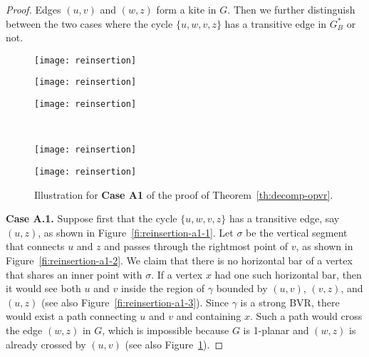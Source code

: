 \documentclass{article}
\begin{document}
\begin{proof}
\smallskip{}  Edges $(u,v)$ and $(w,z)$ form a kite in $G$. Then we further distinguish between the two cases where the cycle $\{u,w,v,z\}$ has a transitive edge in $G^*_B$ or not.


\begin{figure}[t]
    \centering
    \begin{minipage}[b]{.31\textwidth}
    	\centering
    	\texttt{[image: reinsertion]}
    	\subcaption{}\label{fi:reinsertion-a1-1}
    \end{minipage}
     \begin{minipage}[b]{.31\textwidth}
    	\centering
    	\texttt{[image: reinsertion]}
    	\subcaption{}\label{fi:reinsertion-a1-2}
    \end{minipage}
    \begin{minipage}[b]{.31\textwidth}
    	\centering
    	\texttt{[image: reinsertion]}
    	\subcaption{}\label{fi:reinsertion-a1-5}
    \end{minipage}
    \\
    \begin{minipage}[b]{.31\textwidth}
    	\centering
    	\texttt{[image: reinsertion]}
    	\subcaption{}\label{fi:reinsertion-a1-3}
    \end{minipage}
     \begin{minipage}[b]{.31\textwidth}
    	\centering
    	\texttt{[image: reinsertion]}
    	\subcaption{}\label{fi:reinsertion-a1-4}
    \end{minipage}
    \caption{Illustration for {\bf Case A1} of the proof of Theorem~\ref{th:decomp-opvr}.}
\end{figure}

{\bf Case A.1.} Suppose first that the cycle $\{u,w,v,z\}$ has a transitive edge, say $(u,z)$, as shown in Figure~\ref{fi:reinsertion-a1-1}. Let $\sigma$ be the vertical segment that connects $u$ and $z$ and passes through the rightmost point of $v$, as shown in Figure~\ref{fi:reinsertion-a1-2}. We claim that there is no horizontal bar of a vertex that shares an inner point with $\sigma$.  If a vertex $x$ had one such horizontal bar, then it would see both $u$ and $v$ inside the region of $\gamma$ bounded by $(u,v)$, $(v,z)$, and $(u,z)$ (see also Figure~\ref{fi:reinsertion-a1-3}). Since $\gamma$ is a strong BVR, there would exist a path connecting $u$ and $v$ and containing $x$. Such a path would cross the edge $(w,z)$ in $G$, which is impossible because $G$ is 1-planar and $(w,z)$ is already crossed by $(u,v)$ (see also Figure~\ref{fi:reinsertion-a1-4}).


\end{proof}
\end{document}
